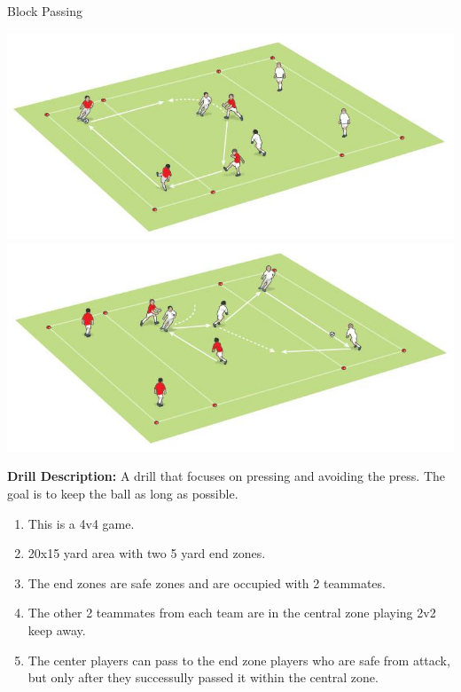\begin{evenBlock}{Block Passing}

\begin{minipage}[t]{\linewidth}
    \centering
    
    \begin{minipage}{.4\linewidth} %
        \centering
        \includegraphics[width=\textwidth]{../img/Trimmed/Block_Passing_1}
        \vspace{6pt}
        \includegraphics[width=\textwidth]{../img/Trimmed/Block_Passing_2}
    \end{minipage}
    \hspace{0.05\linewidth}
    \begin{minipage}{.5\linewidth} %
        \textbf{Drill Description:}
        A drill that focuses on pressing and avoiding the press.  The goal is to keep the ball as long as possible.
        
        \begin{enumerate}
        \setlength{\itemsep}{0pt}
        \setlength{\parskip}{0pt}
        \setlength{\parsep}{0pt}
        \item This is a 4v4 game.
        \item 20x15 yard area with two 5 yard end zones.
        \item The end zones are safe zones and are occupied with 2 teammates.
        \item The other 2 teammates from each team are in the central zone playing 2v2 keep away.
        \item The center players can pass to the end zone players who are safe from attack, but only after they successully passed it within the central zone.
        \end{enumerate}


\end{minipage}
\end{minipage}
\end{evenBlock}
